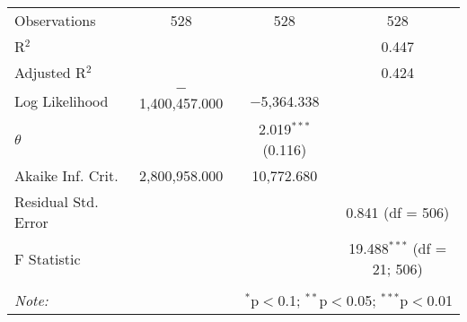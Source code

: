 \begin{table}[!htbp]
\begin{tabular}{@{\extracolsep{5pt}}lccc}
Observations & 528 & 528 & 528 \\ 
R$^{2}$ &  &  & 0.447 \\ 
Adjusted R$^{2}$ &  &  & 0.424 \\ 
Log Likelihood & $-$1,400,457.000 & $-$5,364.338 &  \\ 
$\theta$ &  & 2.019$^{***}$  (0.116) &  \\ 
Akaike Inf. Crit. & 2,800,958.000 & 10,772.680 &  \\ 
Residual Std. Error &  &  & 0.841 (df = 506) \\ 
F Statistic &  &  & 19.488$^{***}$ (df = 21; 506) \\ 
\hline 
\hline \\[-1.8ex] 
\textit{Note:}  & \multicolumn{3}{r}{$^{*}$p$<$0.1; $^{**}$p$<$0.05; $^{***}$p$<$0.01} \\ 
\end{tabular} 
\end{table} 
